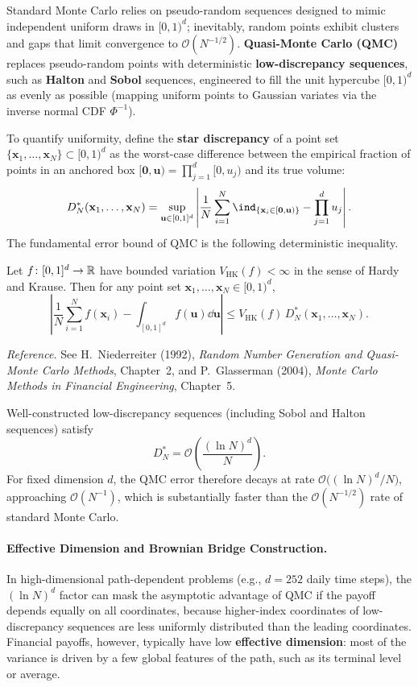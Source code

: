 Standard Monte Carlo relies on pseudo-random sequences designed to mimic independent uniform draws in $[0, 1)^d$; inevitably, random points exhibit clusters and gaps that limit convergence to $\mathcal{O}(N^{-1/2})$. \textbf{Quasi-Monte Carlo (QMC)} replaces pseudo-random points with deterministic \textbf{low-discrepancy sequences}, such as \textbf{Halton} and \textbf{Sobol} sequences, engineered to fill the unit hypercube $[0, 1)^d$ as evenly as possible (mapping uniform points to Gaussian variates via the inverse normal CDF $\Phi^{-1}$).

To quantify uniformity, define the \textbf{star discrepancy} of a point set $\{\mathbf{x}_1, \ldots, \mathbf{x}_N\} \subset [0, 1)^d$ as the worst-case difference between the empirical fraction of points in an anchored box $[\mathbf{0}, \mathbf{u}) = \prod_{j=1}^d [0, u_j)$ and its true volume:
\[
D_N^*(\mathbf{x}_1, \ldots, \mathbf{x}_N) = \sup_{\mathbf{u} \in [0, 1]^d} \left|\frac{1}{N}\sum_{i=1}^N \ind_{\{\mathbf{x}_i \in [\mathbf{0}, \mathbf{u})\}} - \prod_{j=1}^d u_j\right|.
\]
The fundamental error bound of QMC is the following deterministic inequality.

\begin{theorem}\label{thm:koksma-hlawka}
    Let $f \colon [0, 1]^d \to \mathbb{R}$ have bounded variation $V_{\mathrm{HK}}(f) < \infty$ in the sense of Hardy and Krause. Then for any point set $\mathbf{x}_1, \ldots, \mathbf{x}_N \in [0, 1)^d$,
    \begin{equation}\label{eq:koksma-hlawka}
    \left|\frac{1}{N}\sum_{i=1}^N f(\mathbf{x}_i) - \int_{[0, 1]^d} f(\mathbf{u})\dd\mathbf{u}\right| \leq V_{\mathrm{HK}}(f)\,D_N^*(\mathbf{x}_1, \ldots, \mathbf{x}_N).
    \end{equation}
\end{theorem}
\noindent\emph{Reference.} See H.~Niederreiter (1992), \emph{Random Number Generation and Quasi-Monte Carlo Methods}, Chapter~2, and P.~Glasserman (2004), \emph{Monte Carlo Methods in Financial Engineering}, Chapter~5.

Well-constructed low-discrepancy sequences (including Sobol and Halton sequences) satisfy
\[
D_N^* = \mathcal{O}\!\left(\frac{(\ln N)^d}{N}\right).
\]
For fixed dimension $d$, the QMC error therefore decays at rate $\mathcal{O}\bigl((\ln N)^d / N\bigr)$, approaching $\mathcal{O}(N^{-1})$, which is substantially faster than the $\mathcal{O}(N^{-1/2})$ rate of standard Monte Carlo.

\paragraph{Effective Dimension and Brownian Bridge Construction.}
In high-dimensional path-dependent problems (e.g., $d = 252$ daily time steps), the $(\ln N)^d$ factor can mask the asymptotic advantage of QMC if the payoff depends equally on all coordinates, because higher-index coordinates of low-discrepancy sequences are less uniformly distributed than the leading coordinates. Financial payoffs, however, typically have low \textbf{effective dimension}: most of the variance is driven by a few global features of the path, such as its terminal level or average.

